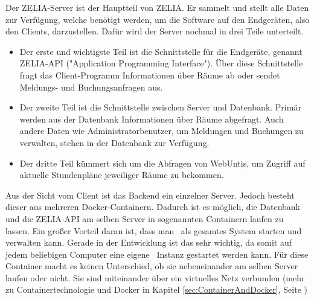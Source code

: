 
Der ZELIA-Server ist der Hauptteil von ZELIA. Er sammelt und stellt alle Daten zur Verfügung, welche benötigt werden, um die Software auf den Endgeräten, also den Clients, darzustellen. Dafür wird der Server nochmal in drei Teile unterteilt.

\begin{itemize}
    \item Der erste und wichtigste Teil ist die Schnittstelle für die Endgeräte, genannt ZELIA-API ("Application Programming Interface"). Über diese Schnittstelle fragt das Client-Programm Informationen über Räume ab oder sendet Meldungs- und Buchungsanfragen aus.
    \item Der zweite Teil ist die Schnittstelle zwischen Server und Datenbank. Primär werden aus der Datenbank Informationen über Räume abgefragt. Auch andere Daten wie Administratorbenutzer, um Meldungen und Buchungen zu verwalten, stehen in der Datenbank zur Verfügung. 
    \item Der dritte Teil kümmert sich um die Abfragen von WebUntis, um Zugriff auf aktuelle Stundenpläne jeweiliger Räume zu bekommen.
\end{itemize}

Aus der Sicht vom Client ist das Backend ein einzelner Server. Jedoch besteht dieser aus mehreren Docker-Containern. Dadurch ist es möglich, die Datenbank und die ZELIA-API am selben Server in sogenannten Containern laufen zu lassen. Ein großer Vorteil daran ist, dass man \ZELIA\ als gesamtes System starten und verwalten kann. Gerade in der Entwicklung ist das sehr wichtig, da somit auf jedem beliebigen Computer eine eigene \ZELIA\ Instanz gestartet werden kann. Für diese Container macht es keinen Unterschied, ob sie nebeneinander am selben Server laufen oder nicht. Sie sind miteinander über ein virtuelles Netz verbunden (mehr zu Containertechnologie und Docker in Kapitel \ref{sec:ContainerAndDocker}, Seite \pageref{sec:ContainerAndDocker})

